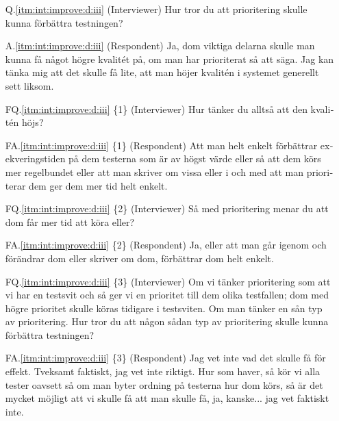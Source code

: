 \begin{otherlanguage}{swedish}
\begin{itemize}
  \item[Q.\ref{itm:int:improve:d:iii}] (Interviewer) Hur tror du att prioritering skulle kunna förbättra testningen?
  \item[A.\ref{itm:int:improve:d:iii}] (Respondent) Ja, dom viktiga delarna skulle man kunna få något högre kvalitét på, om man har prioriterat så att säga. Jag kan tänka mig att det skulle få lite, att man höjer kvalitén i systemet generellt sett liksom. 
  \item[FQ.\ref{itm:int:improve:d:iii} \{1\}] (Interviewer) Hur tänker du alltså att den kvalitén höjs?
  \item[FA.\ref{itm:int:improve:d:iii} \{1\}] (Respondent) Att man helt enkelt förbättrar exekveringstiden på dem testerna som är av högst värde eller så att dem körs mer regelbundet eller att man skriver om vissa eller i och med att man prioriterar dem ger dem mer tid helt enkelt.
  \item[FQ.\ref{itm:int:improve:d:iii} \{2\}] (Interviewer) Så med prioritering menar du att dom får mer tid att köra eller?
  \item[FA.\ref{itm:int:improve:d:iii} \{2\}] (Respondent) Ja, eller att man går igenom och förändrar dom eller skriver om dom, förbättrar dom helt enkelt. 
  \item[FQ.\ref{itm:int:improve:d:iii} \{3\}] (Interviewer) Om vi tänker prioritering som att vi har en testsvit och så ger vi en prioritet till dem olika testfallen; dom med högre prioritet skulle köras tidigare i testsviten. Om man tänker en sån typ av prioritering. Hur tror du att någon sådan typ av prioritering skulle kunna förbättra testningen?
  \item[FA.\ref{itm:int:improve:d:iii} \{3\}] (Respondent) Jag vet inte vad det skulle få för effekt. Tveksamt faktiskt, jag vet inte riktigt. Hur som haver, så kör vi alla tester oavsett så om man byter ordning på testerna hur dom körs, så är det mycket möjligt att vi skulle få att man skulle få, ja, kanske... jag vet faktiskt inte. 
  

\end{itemize}
\end{otherlanguage}
